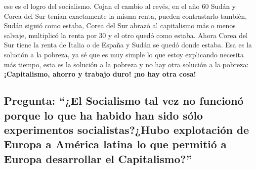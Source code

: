 ese es el logro del socialismo. Cojan el cambio al revés, en el año 60 Sudán y Corea del Sur tenían exactamente la misma renta, pueden contrastarlo también, Sudán siguió como estaba, Corea del Sur abrazó al capitalismo más o menos salvaje, multiplicó la renta por 30 y el otro quedó como estaba. Ahora Corea del Sur tiene la renta de Italia o de España y Sudán se quedó donde estaba. Esa es la solución a la pobreza, ya sé que es muy simple lo que estoy explicando necesita más tiempo, esta es la solución a la pobreza y no hay otra solución a la pobreza: \textbf{¡Capitalismo, ahorro y trabajo duro! ¡no hay otra cosa!}

\subsection{Pregunta: \enquote{¿El Socialismo tal vez no funcionó porque lo que ha habido han sido sólo experimentos socialistas?¿Hubo explotación de Europa a América latina lo que permitió a Europa desarrollar el Capitalismo?}}


